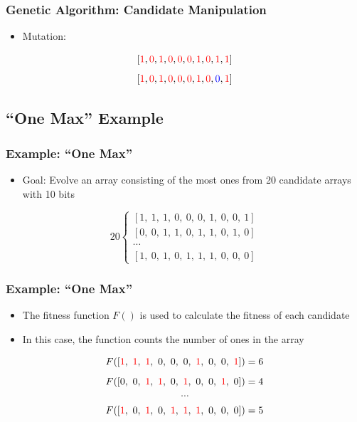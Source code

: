 \documentclass{beamer}
\begin{document}
\begin{frame}
  \frametitle{Genetic Algorithm: Candidate Manipulation}
\begin{itemize}
  \item Mutation:
\end{itemize}
\[
[ \textcolor{red}{1},  \textcolor{red}{0}, \textcolor{red}{1},  \textcolor{red}{0},  \textcolor{red}{0},  \textcolor{red}{0}, \textcolor{red}{1}, \textcolor{red}{0}, \textcolor{red}{1}, \textcolor{red}{1} ]
\]
\[[ \textcolor{red}{1},  \textcolor{red}{0}, \textcolor{red}{1},  \textcolor{red}{0},  \textcolor{red}{0},  \textcolor{red}{0}, \textcolor{red}{1}, \textcolor{red}{0}, \textcolor{blue}{0}, \textcolor{red}{1} ]
\]
\end{frame}

\subsection{``One Max'' Example}
\begin{frame}
  \frametitle{Example: ``One Max''}
\begin{itemize}
\item Goal: Evolve an array consisting of the most ones from 20 candidate arrays with 10 bits
\end{itemize}
\[
20 \left\{\begin{matrix}
[  1,~1,~1,~0,~ 0,~0,~1,~0,~0,~1] \\ %
[  0,~0,~1,~1,~ 0,~1,~1,~0,~1,~0] \\
\cdots\\
[  1 ,~0,~1,~0,~ 1,~1,~1,~0,~0,~0] 
\end{matrix}\right.
\]
\end{frame}

\begin{frame}
  \frametitle{Example: ``One Max''}
\begin{itemize}
\item The fitness function $F()$ is used to calculate the fitness of each candidate
\item In this case, the function counts the number of ones in the array
\end{itemize}

\[F([   \textcolor{red}{1},~\textcolor{red}{1},~ \textcolor{red}{1},~0,~ 0,~0,~\textcolor{red}{1},~ 0,~ 0,~ \textcolor{red}{1}]  ) = 6 \]%
\[F([  0 ,~0,~ \textcolor{red}{1},~ \textcolor{red}{1},~ 0,~ \textcolor{red}{1},~0,~0,~ \textcolor{red}{1},~0]) = 4\]
\[\cdots\]
\[F([   \textcolor{red}{1},~0,~ \textcolor{red}{1},~0,~  \textcolor{red}{1},~ \textcolor{red}{1},~ \textcolor{red}{1},~0,~0,~0]) = 5\]
\end{frame}
\end{document}
